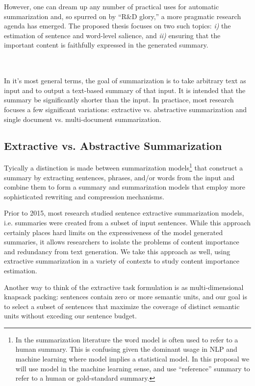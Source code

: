 However, one can dream up any number of practical uses for automatic 
summarization and, so spurred on by ``R\&D glory,'' a more pragmatic research 
agenda has emerged. The proposed thesis focuses on two such topics:
\textit{i)} the estimation of sentence and word-level salience, and 
\textit{ii)} ensuring that the important content is faithfully expressed 
in the generated summary.

~\\
~\\


In it's most general terms, the goal of summarization is to take arbitrary
text as input and to output a text-based summary of that input. It is
intended that the summary be significantly shorter than the input. 
In practiace, most research focuses a few significant variations:
extractive vs. abstractive summarization and 
single document vs. multi-document summarization. 



\subsection{Extractive vs. Abstractive Summarization}

Tyically a distinction is made between summarization models\footnote{In the
summarization literature the word model is often used to refer to a human 
summary. This is confusing given the dominant usage in NLP and machine learning where model implies a statistical model. In this proposal we will use model
in the machine learning sense, and use ``reference'' summary to refer to a 
human or gold-standard summary. } that construct a summary by extracting
sentences, phrases, and/or words from the input and combine them to
form a summary and summarization models that employ more
sophisticated rewriting and compression mechanisms.

Prior to 2015, most research studied sentence extractive summarization models,
i.e. summaries were created from a subset of input sentences.
While this approach certainly places hard limits on the expressiveness of 
the model generated summaries, it allows researchers to isolate the 
problems of content importance and redundancy from text generation.
We take this approach as well, using extractive summarization in a variety
of contexts to study content importance estimation.

Another way to think of the extractive task formulation is as multi-dimensional
knapsack packing: sentences contain zero or more semantic units, and our
goal is to select a subset of sentences that maximize the coverage of distinct semantic units without exceding our sentence budget. 



